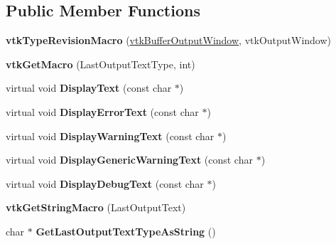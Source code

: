 \subsection*{Public Member Functions}
\begin{DoxyCompactItemize}
\item 
\hypertarget{classvtkBufferOutputWindow_afd19096fa4aa7913e893fb5abdd0cc98}{
{\bfseries vtkTypeRevisionMacro} (\hyperlink{classvtkBufferOutputWindow}{vtkBufferOutputWindow}, vtkOutputWindow)}
\label{classvtkBufferOutputWindow_afd19096fa4aa7913e893fb5abdd0cc98}

\item 
\hypertarget{classvtkBufferOutputWindow_a918f8620ab41197ea715c78d8409000f}{
{\bfseries vtkGetMacro} (LastOutputTextType, int)}
\label{classvtkBufferOutputWindow_a918f8620ab41197ea715c78d8409000f}

\item 
\hypertarget{classvtkBufferOutputWindow_a3e517990355da23f2e2ee8771fa9b16d}{
virtual void {\bfseries DisplayText} (const char $\ast$)}
\label{classvtkBufferOutputWindow_a3e517990355da23f2e2ee8771fa9b16d}

\item 
\hypertarget{classvtkBufferOutputWindow_acf6afdc765b77ee1b733b0c59593030d}{
virtual void {\bfseries DisplayErrorText} (const char $\ast$)}
\label{classvtkBufferOutputWindow_acf6afdc765b77ee1b733b0c59593030d}

\item 
\hypertarget{classvtkBufferOutputWindow_ab7bc064af99237c9b751a0cf71695255}{
virtual void {\bfseries DisplayWarningText} (const char $\ast$)}
\label{classvtkBufferOutputWindow_ab7bc064af99237c9b751a0cf71695255}

\item 
\hypertarget{classvtkBufferOutputWindow_a7cd70d39ea9f13ec313d3045d231e33e}{
virtual void {\bfseries DisplayGenericWarningText} (const char $\ast$)}
\label{classvtkBufferOutputWindow_a7cd70d39ea9f13ec313d3045d231e33e}

\item 
\hypertarget{classvtkBufferOutputWindow_ab698cd926b6ee0f60bef55c62c0ef6a6}{
virtual void {\bfseries DisplayDebugText} (const char $\ast$)}
\label{classvtkBufferOutputWindow_ab698cd926b6ee0f60bef55c62c0ef6a6}

\item 
\hypertarget{classvtkBufferOutputWindow_afaa102e284c4277c39f2c653e9678fd8}{
{\bfseries vtkGetStringMacro} (LastOutputText)}
\label{classvtkBufferOutputWindow_afaa102e284c4277c39f2c653e9678fd8}

\item 
\hypertarget{classvtkBufferOutputWindow_ac2345b86da92e8ea87bc45c3fe4044ec}{
char $\ast$ {\bfseries GetLastOutputTextTypeAsString} ()}
\label{classvtkBufferOutputWindow_ac2345b86da92e8ea87bc45c3fe4044ec}

\end{DoxyCompactItemize}
